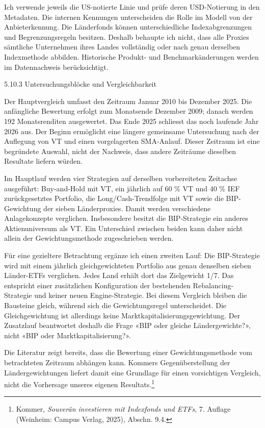 \documentclass[
  ngerman,
  a4paper,
  DIV=11,
  oneside]{scrreprt}
\begin{document}
Ich verwende jeweils die US-notierte Linie und prüfe deren USD-Notierung
in den Metadaten. Die internen Kennungen unterscheiden die Rolle im
Modell von der Anbieterkennung. Die Länderfonds können unterschiedliche
Indexabgrenzungen und Begrenzungsregeln besitzen. Deshalb behaupte ich
nicht, dass alle Proxies sämtliche Unternehmen ihres Landes vollständig
oder nach genau derselben Indexmethode abbilden. Historische Produkt-
und Benchmarkänderungen werden im Datennachweis berücksichtigt.

5.10.3 Untersuchungsblöcke und Vergleichbarkeit

Der Hauptvergleich umfasst den Zeitraum Januar 2010 bis Dezember 2025.
Die anfängliche Bewertung erfolgt zum Monatsende Dezember 2009; danach
werden 192 Monatsrenditen ausgewertet. Das Ende 2025 schliesst das noch
laufende Jahr 2026 aus. Der Beginn ermöglicht eine längere gemeinsame
Untersuchung nach der Auflegung von VT und einen vorgelagerten
SMA-Anlauf. Dieser Zeitraum ist eine begründete Auswahl, nicht der
Nachweis, dass andere Zeiträume dieselben Resultate liefern würden.

Im Hauptlauf werden vier Strategien auf derselben vorbereiteten
Zeitachse ausgeführt: Buy-and-Hold mit VT, ein jährlich auf 60 \% VT und
40 \% IEF zurückgesetztes Portfolio, die Long/Cash-Trendfolge mit VT
sowie die BIP-Gewichtung der sieben Länderproxies. Damit werden
verschiedene Anlagekonzepte verglichen. Insbesondere besitzt die
BIP-Strategie ein anderes Aktienuniversum als VT. Ein Unterschied
zwischen beiden kann daher nicht allein der Gewichtungsmethode
zugeschrieben werden.

Für eine gezieltere Betrachtung ergänze ich einen zweiten Lauf: Die
BIP-Strategie wird mit einem jährlich gleichgewichteten Portfolio aus
genau denselben sieben Länder-ETFs verglichen. Jedes Land erhält dort
das Zielgewicht 1/7. Das entspricht einer zusätzlichen Konfiguration der
bestehenden Rebalancing-Strategie und keiner neuen Engine-Strategie. Bei
diesem Vergleich bleiben die Bausteine gleich, während sich die
Gewichtungsregel unterscheidet. Die Gleichgewichtung ist allerdings
keine Marktkapitalisierungsgewichtung. Der Zusatzlauf beantwortet
deshalb die Frage «BIP oder gleiche Ländergewichte?», nicht «BIP oder
Marktkapitalisierung?».

Die Literatur zeigt bereits, dass die Bewertung einer Gewichtungsmethode
vom betrachteten Zeitraum abhängen kann. Kommers Gegenüberstellung der
Ländergewichtungen liefert damit eine Grundlage für einen vorsichtigen
Vergleich, nicht die Vorhersage unseres eigenen Resultats.\footnote{Kommer,
  \emph{Souverän investieren mit Indexfonds und ETFs}, 7. Auflage
  (Weinheim: Campus Verlag, 2025), Abschn. 9.4.}
\end{document}
